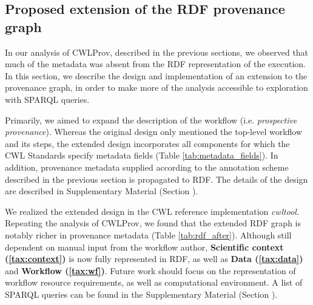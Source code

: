 \subsection{Proposed extension of the RDF provenance graph}
\label{sec:prov_rdf_extension}
In our analysis of CWLProv, described in the previous sections, we observed that much of the metadata was absent from the RDF representation of the execution. In this section, we describe the design and implementation of an extension to the provenance graph, in order to make more of the analysis accessible to exploration with SPARQL queries. 



Primarily, we aimed to expand the description of the workflow (i.e. \emph{prospective provenance}). Whereas the original design only mentioned the top-level workflow and its steps, the extended design incorporates all components for which the CWL Standards specify metadata fields (Table \ref{tab:metadata_fields}). In addition, provenance metadata supplied according to the annotation scheme described in the previous section is propagated to RDF. The details of the design are described in Supplementary Material (Section \emph{}). 

We  realized the extended design in the CWL reference implementation \emph{cwltool}. Repeating the analysis of CWLProv, we found that the extended RDF graph is notably richer in provenance metadata (Table \ref{tab:rdf_after}). Although still dependent on manual input from the workflow author, \textbf{Scientific context (\ref{tax:context})} is now fully represented in RDF, as well as \textbf{Data (\ref{tax:data})} and \textbf{Workflow (\ref{tax:wf})}. Future work should focus on the representation of workflow resource requirements, as well as computational environment. A list of SPARQL queries  can be found in the Supplementary Material (Section \emph{}). 




%


% 

% 